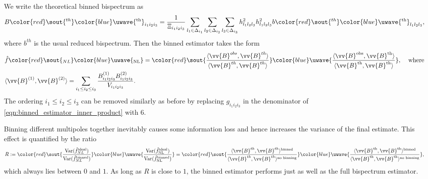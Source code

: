 \documentclass[a4paper,12pt,times,custombib,print,index]{Classes/PhDThesisPSnPDF} %
\providecommand{\DIFadd}[1]{{\protect\color{blue}\uwave{#1}}} %
\providecommand{\DIFdel}[1]{{\protect\color{red}\sout{#1}}}                      %
\providecommand{\DIFaddbegin}{} %
\providecommand{\DIFaddend}{} %
\providecommand{\DIFdelbegin}{} %
\providecommand{\DIFdelend}{} %
\newcommand{\DIFscaledelfig}{0.5}
\newlength{\DIFdelgraphicswidth} %
\newlength{\DIFdelgraphicsheight} %
\newcommand{\DIFaddincludegraphics}[2][]{{\color{blue}\fbox{\DIFOincludegraphics[#1]{#2}}}} %
\newcommand{\DIFdelincludegraphics}[2][]{%
\sbox{\DIFdelgraphicsbox}{\DIFOincludegraphics[#1]{#2}}%
\settoboxwidth{\DIFdelgraphicswidth}{\DIFdelgraphicsbox} %
\settoboxtotalheight{\DIFdelgraphicsheight}{\DIFdelgraphicsbox} %
\scalebox{\DIFscaledelfig}{%
\parbox[b]{\DIFdelgraphicswidth}{\usebox{\DIFdelgraphicsbox}\\[-\baselineskip] \rule{\DIFdelgraphicswidth}{0em}}\llap{\resizebox{\DIFdelgraphicswidth}{\DIFdelgraphicsheight}{%
\setlength{\unitlength}{\DIFdelgraphicswidth}%
\begin{picture}(1,1)%
\thicklines\linethickness{2pt} %
{\color[rgb]{1,0,0}\put(0,0){\framebox(1,1){}}}%
{\color[rgb]{1,0,0}\put(0,0){\line( 1,1){1}}}%
{\color[rgb]{1,0,0}\put(0,1){\line(1,-1){1}}}%
\end{picture}%
}\hspace*{3pt}}} %
} %
\DeclareRobustCommand{\DIFaddbegin}{\DIFOaddbegin \let\includegraphics\DIFaddincludegraphics} %
\DeclareRobustCommand{\DIFaddend}{\DIFOaddend \let\includegraphics\DIFOincludegraphics} %
\DeclareRobustCommand{\DIFdelbegin}{\DIFOdelbegin \let\includegraphics\DIFdelincludegraphics} %
\DeclareRobustCommand{\DIFdelend}{\DIFOaddend \let\includegraphics\DIFOincludegraphics} %
\begin{document}
We write the theoretical binned bispectrum as
\begin{align}
	B\DIFdelbegin \DIFdel{^{th}}\DIFdelend \DIFaddbegin \DIFadd{^\text{th}}\DIFaddend _{i_1 i_2 i_3} =  \frac{1}{\Xi_{i_1 i_2 i_3}} \sum_{l_1 \in \Delta_{i_1}} \sum_{l_2 \in \Delta_{i_2}} \sum_{l_3 \in \Delta_{i_3}} h^2_{l_1 l_2 l_3} h^2_{l_1 l_2 l_3} b\DIFdelbegin \DIFdel{^{th}}\DIFdelend \DIFaddbegin \DIFadd{^\text{th}}\DIFaddend _{l_1 l_2 l_3}, \label{eqn:binned_estimator_theoretical_bispectra}
\end{align}
where \DIFdelbegin \DIFdel{$b^{th}$ }\DIFdelend \DIFaddbegin \DIFadd{$b^\text{th}$ }\DIFaddend is the usual reduced bispectrum. Then the binned estimator takes the form
\begin{align}
	&\hat{f}\DIFdelbegin \DIFdel{_{NL} }\DIFdelend \DIFaddbegin \DIFadd{_\text{NL} }\DIFaddend = \DIFdelbegin \DIFdel{\frac{\langle \vv{B}^{obs}, \vv{B}^{th} \rangle}{\langle \vv{B}^{th}, \vv{B}^{th} \rangle}}\DIFdelend \DIFaddbegin \DIFadd{\frac{\langle \vv{B}^\text{obs}, \vv{B}^\text{th} \rangle}{\langle \vv{B}^\text{th}, \vv{B}^\text{th} \rangle}}\DIFaddend , \;\;\;\;\text{where} \\
	&\langle \vv{B}^{(1)}, \vv{B}^{(2)} \rangle = \sum_{i_1 \le i_2 \le i_3} \frac{B^{(1)}_{i_1 i_2 i_3} B^{(2)}_{i_1 i_2 i_3}}{V_{i_1 i_2 i_3}}. \label{eqn:binned_estimator_inner_product}
\end{align}
The ordering $i_1 \le i_2 \le i_3$ can be removed similarly as before by replacing $g_{i_1 i_2 i_3}$ in the denominator of \eqref{eqn:binned_estimator_inner_product} with $6$.

Binning different multipoles together inevitably causes some information loss and hence increases the variance of the final estimate. This effect is quantified by the ratio
\begin{align}
	R := \DIFdelbegin \DIFdel{\frac{\text{Var}(\hat{f}^\text{ideal}_{NL})}{\text{Var}(\hat{f}^\text{binned}_{NL})} }\DIFdelend \DIFaddbegin \DIFadd{\frac{\text{Var}(\hat{f}^\text{ideal}_\text{NL})}{\text{Var}(\hat{f}^\text{binned}_\text{NL})} }\DIFaddend = \DIFdelbegin \DIFdel{\frac{\langle \vv{B}^{th}, \vv{B}^{th} \rangle^\text{binned}}{\langle \vv{B}^{th}, \vv{B}^{th} \rangle^\text{no binning}}}\DIFdelend \DIFaddbegin \DIFadd{\frac{\langle \vv{B}^\text{th}, \vv{B}^\text{th} \rangle^\text{binned}}{\langle \vv{B}^\text{th}, \vv{B}^\text{th} \rangle^\text{no binning}}}\DIFaddend , 
\end{align}
which always lies between $0$ and $1$. As long as $R$ is close to $1$, the binned estimator performs just as well as the full bispectrum estimator.
\end{document}
